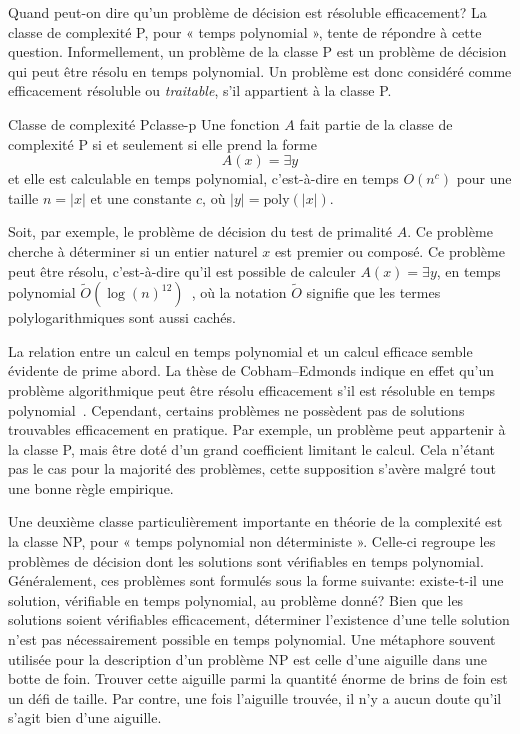 Quand peut-on dire qu'un problème de décision est résoluble efficacement? La classe de complexité \textsf{P}, pour « temps polynomial », tente de répondre à cette question. Informellement, un problème de la classe \textsf{P} est un problème de décision qui peut être résolu en temps polynomial. Un problème est donc considéré comme efficacement résoluble ou \textit{traitable}, s'il appartient à la classe \textsf{P}. 

\begin{maindefinition}{Classe de complexité \textsf{P}}{classe-p}
    Une fonction $A$ fait partie de la classe de complexité \textsf{P} si et seulement si elle prend la forme 
    \begin{equation*}
        A(x)=\exists y
    \end{equation*}
    et elle est calculable en temps polynomial, c’est-à-dire en temps $O(n^{c})$ pour une taille $n = \lvert x \rvert$ et une constante $c$, où $\lvert y \rvert = \mathrm{poly}(\lvert x \rvert )$.
\end{maindefinition}

Soit, par exemple, le problème de décision du test de primalité $A$. Ce problème cherche à déterminer si un entier naturel $x$ est premier ou composé. Ce problème peut être résolu, c'est-à-dire qu'il est possible de calculer $A(x)=\exists y$, en temps polynomial $\tilde{O}(\log(n)^{12})$~\cite{agrawalPRIMES2004}, où la notation $\tilde{O}$ signifie que les termes polylogarithmiques sont aussi cachés. 

La relation entre un calcul en temps polynomial et un calcul efficace semble évidente de prime abord. La thèse de Cobham–Edmonds indique en effet qu'un problème algorithmique peut être résolu efficacement s'il est résoluble en temps polynomial~\cite{cobhamIntrinsicComputationalDifficulty1965, edmondsPathsTreesFlowers1965}. Cependant, certains problèmes ne possèdent pas de solutions trouvables efficacement en pratique. Par exemple, un problème peut appartenir à la classe \textsf{P}, mais être doté d'un grand coefficient limitant le calcul. Cela n'étant pas le cas pour la majorité des problèmes, cette supposition s'avère malgré tout une bonne règle empirique. 

Une deuxième classe particulièrement importante en théorie de la complexité est la classe \textsf{NP}, pour « temps polynomial non déterministe ». Celle-ci regroupe les problèmes de décision dont les solutions sont vérifiables en temps polynomial. Généralement, ces problèmes sont formulés sous la forme suivante: existe-t-il une solution, vérifiable en temps polynomial, au problème donné? Bien que les solutions soient vérifiables efficacement, déterminer l'existence d'une telle solution n'est pas nécessairement possible en temps polynomial. Une métaphore souvent utilisée pour la description d'un problème \textsf{NP} est celle d'une aiguille dans une botte de foin. Trouver cette aiguille parmi la quantité énorme de brins de foin est un défi de taille. Par contre, une fois l'aiguille trouvée, il n'y a aucun doute qu'il s'agit bien d'une aiguille. 

